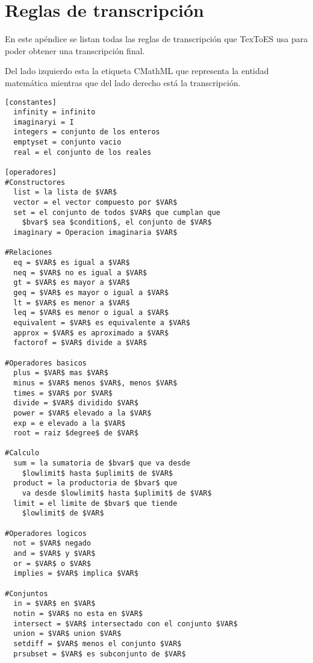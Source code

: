 \chapter{Reglas de transcripción}

\label{AppendixB}

En este apéndice se listan todas las reglas de transcripción que TexToES usa para poder obtener una transcripción final.

Del lado izquierdo esta la etiqueta CMathML que representa la entidad matemática mientras que del lado derecho está la transcripción.

\begin{lstlisting}[basicstyle=\scriptsize]
[constantes]
  infinity = infinito
  imaginaryi = I
  integers = conjunto de los enteros
  emptyset = conjunto vacio
  real = el conjunto de los reales

[operadores]
#Constructores
  list = la lista de $VAR$
  vector = el vector compuesto por $VAR$
  set = el conjunto de todos $VAR$ que cumplan que
    $bvar$ sea $condition$, el conjunto de $VAR$
  imaginary = Operacion imaginaria $VAR$

#Relaciones
  eq = $VAR$ es igual a $VAR$
  neq = $VAR$ no es igual a $VAR$
  gt = $VAR$ es mayor a $VAR$
  geq = $VAR$ es mayor o igual a $VAR$
  lt = $VAR$ es menor a $VAR$
  leq = $VAR$ es menor o igual a $VAR$
  equivalent = $VAR$ es equivalente a $VAR$
  approx = $VAR$ es aproximado a $VAR$
  factorof = $VAR$ divide a $VAR$

#Operadores basicos
  plus = $VAR$ mas $VAR$
  minus = $VAR$ menos $VAR$, menos $VAR$
  times = $VAR$ por $VAR$
  divide = $VAR$ dividido $VAR$
  power = $VAR$ elevado a la $VAR$
  exp = e elevado a la $VAR$
  root = raiz $degree$ de $VAR$

#Calculo
  sum = la sumatoria de $bvar$ que va desde
    $lowlimit$ hasta $uplimit$ de $VAR$
  product = la productoria de $bvar$ que
    va desde $lowlimit$ hasta $uplimit$ de $VAR$
  limit = el limite de $bvar$ que tiende
    $lowlimit$ de $VAR$

#Operadores logicos
  not = $VAR$ negado
  and = $VAR$ y $VAR$
  or = $VAR$ o $VAR$
  implies = $VAR$ implica $VAR$

#Conjuntos
  in = $VAR$ en $VAR$
  notin = $VAR$ no esta en $VAR$
  intersect = $VAR$ intersectado con el conjunto $VAR$
  union = $VAR$ union $VAR$
  setdiff = $VAR$ menos el conjunto $VAR$
  prsubset = $VAR$ es subconjunto de $VAR$


\end{lstlisting}
